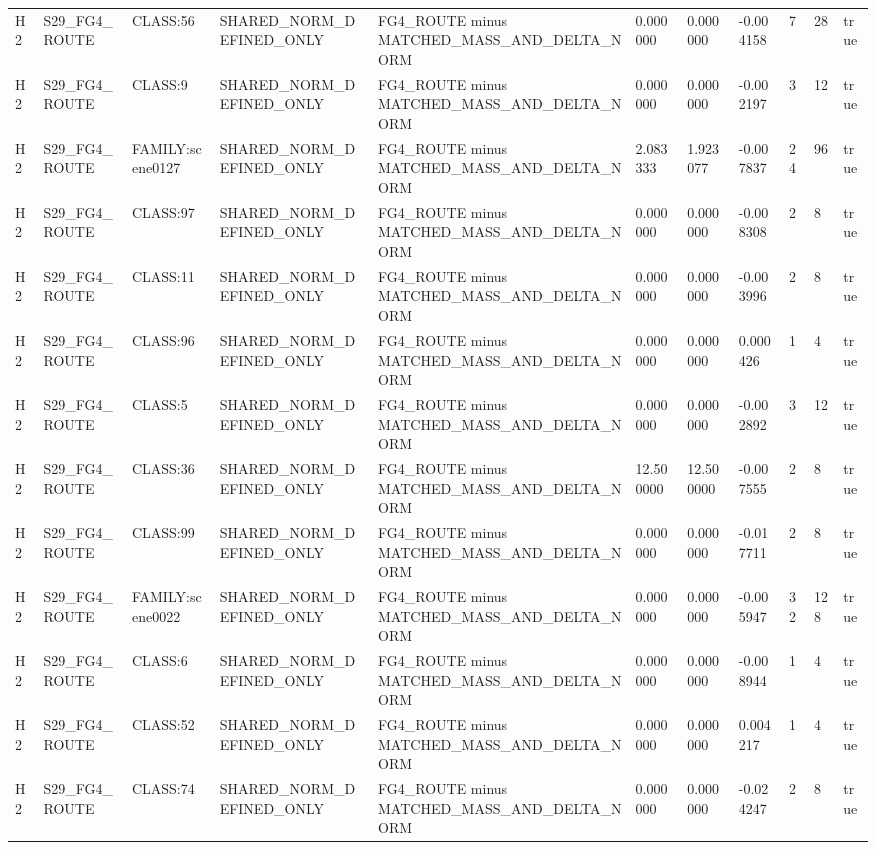 \begin{tabular}{lllllllllll}
H2 & S29\_FG4\_ROUTE & CLASS:56 & SHARED\_NORM\_DEFINED\_ONLY & FG4\_ROUTE minus MATCHED\_MASS\_AND\_DELTA\_NORM & 0.000000 & 0.000000 & -0.004158 & 7 & 28 & true \\
H2 & S29\_FG4\_ROUTE & CLASS:9 & SHARED\_NORM\_DEFINED\_ONLY & FG4\_ROUTE minus MATCHED\_MASS\_AND\_DELTA\_NORM & 0.000000 & 0.000000 & -0.002197 & 3 & 12 & true \\
H2 & S29\_FG4\_ROUTE & FAMILY:scene0127 & SHARED\_NORM\_DEFINED\_ONLY & FG4\_ROUTE minus MATCHED\_MASS\_AND\_DELTA\_NORM & 2.083333 & 1.923077 & -0.007837 & 24 & 96 & true \\
H2 & S29\_FG4\_ROUTE & CLASS:97 & SHARED\_NORM\_DEFINED\_ONLY & FG4\_ROUTE minus MATCHED\_MASS\_AND\_DELTA\_NORM & 0.000000 & 0.000000 & -0.008308 & 2 & 8 & true \\
H2 & S29\_FG4\_ROUTE & CLASS:11 & SHARED\_NORM\_DEFINED\_ONLY & FG4\_ROUTE minus MATCHED\_MASS\_AND\_DELTA\_NORM & 0.000000 & 0.000000 & -0.003996 & 2 & 8 & true \\
H2 & S29\_FG4\_ROUTE & CLASS:96 & SHARED\_NORM\_DEFINED\_ONLY & FG4\_ROUTE minus MATCHED\_MASS\_AND\_DELTA\_NORM & 0.000000 & 0.000000 & 0.000426 & 1 & 4 & true \\
H2 & S29\_FG4\_ROUTE & CLASS:5 & SHARED\_NORM\_DEFINED\_ONLY & FG4\_ROUTE minus MATCHED\_MASS\_AND\_DELTA\_NORM & 0.000000 & 0.000000 & -0.002892 & 3 & 12 & true \\
H2 & S29\_FG4\_ROUTE & CLASS:36 & SHARED\_NORM\_DEFINED\_ONLY & FG4\_ROUTE minus MATCHED\_MASS\_AND\_DELTA\_NORM & 12.500000 & 12.500000 & -0.007555 & 2 & 8 & true \\
H2 & S29\_FG4\_ROUTE & CLASS:99 & SHARED\_NORM\_DEFINED\_ONLY & FG4\_ROUTE minus MATCHED\_MASS\_AND\_DELTA\_NORM & 0.000000 & 0.000000 & -0.017711 & 2 & 8 & true \\
H2 & S29\_FG4\_ROUTE & FAMILY:scene0022 & SHARED\_NORM\_DEFINED\_ONLY & FG4\_ROUTE minus MATCHED\_MASS\_AND\_DELTA\_NORM & 0.000000 & 0.000000 & -0.005947 & 32 & 128 & true \\
H2 & S29\_FG4\_ROUTE & CLASS:6 & SHARED\_NORM\_DEFINED\_ONLY & FG4\_ROUTE minus MATCHED\_MASS\_AND\_DELTA\_NORM & 0.000000 & 0.000000 & -0.008944 & 1 & 4 & true \\
H2 & S29\_FG4\_ROUTE & CLASS:52 & SHARED\_NORM\_DEFINED\_ONLY & FG4\_ROUTE minus MATCHED\_MASS\_AND\_DELTA\_NORM & 0.000000 & 0.000000 & 0.004217 & 1 & 4 & true \\
H2 & S29\_FG4\_ROUTE & CLASS:74 & SHARED\_NORM\_DEFINED\_ONLY & FG4\_ROUTE minus MATCHED\_MASS\_AND\_DELTA\_NORM & 0.000000 & 0.000000 & -0.024247 & 2 & 8 & true \\

\end{tabular}
